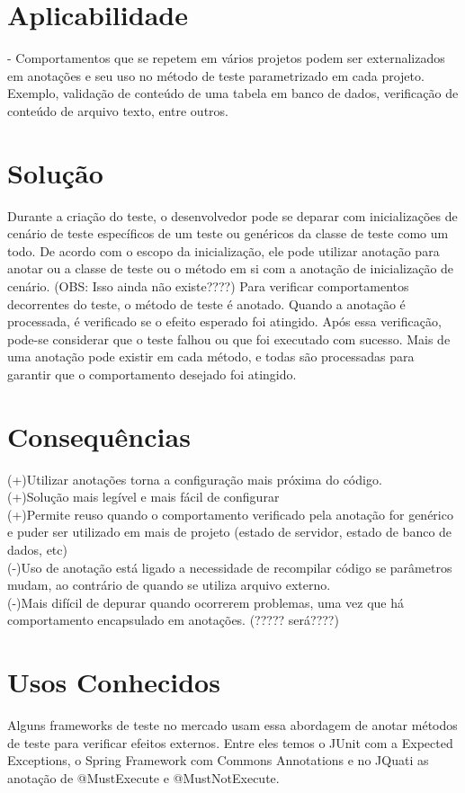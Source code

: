 \documentclass[12pt,a4paper,oneside]{book}
\begin{document}
\section{Aplicabilidade}
- Comportamentos que se repetem em vários projetos podem ser externalizados em anotações e seu uso no método de teste parametrizado em cada projeto. Exemplo, validação de conteúdo de uma tabela em banco de dados, verificação de conteúdo de arquivo texto, entre outros.\\

\section{Solução}
Durante a criação do teste, o desenvolvedor pode se deparar com inicializações de cenário de teste específicos de um teste ou genéricos da classe de teste como um todo. De acordo com o escopo da inicialização, ele pode utilizar anotação para anotar ou a classe de teste ou o método em si com a anotação de inicialização de cenário. (OBS: Isso ainda não existe????)
Para verificar comportamentos decorrentes do teste, o método de teste é anotado. Quando a anotação é processada, é verificado se o efeito esperado foi atingido. Após essa verificação, pode-se considerar que o teste falhou ou que foi executado com sucesso. Mais de uma anotação pode existir em cada método, e todas são processadas para garantir que o comportamento desejado foi atingido.

\section{Consequências}
(+)Utilizar anotações torna a configuração mais próxima do código.\\
(+)Solução mais legível e mais fácil de configurar\\
(+)Permite reuso quando o comportamento verificado pela anotação for genérico e puder ser utilizado em mais de projeto (estado de servidor, estado de banco de dados, etc)\\
(-)Uso de anotação está ligado a necessidade de recompilar código se parâmetros mudam, ao contrário de quando se utiliza arquivo externo.\\
(-)Mais difícil de depurar quando ocorrerem problemas, uma vez que há comportamento encapsulado em anotações. (????? será????)\\


\section{Usos Conhecidos}
Alguns frameworks de teste no mercado usam essa abordagem de anotar métodos de teste para verificar efeitos externos. Entre eles temos o JUnit com a Expected Exceptions, o Spring Framework com Commons Annotations e no JQuati as anotação de @MustExecute e @MustNotExecute.
\end{document}
